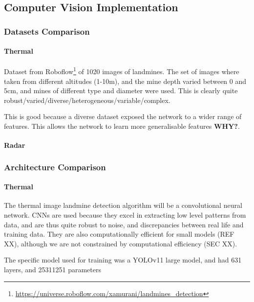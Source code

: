 \subsection{Computer Vision Implementation} \label{compvis_implementation}

\subsubsection{Datasets Comparison}

    \paragraph{Thermal}
    
        Dataset from Roboflow\footnote{\url{https://universe.roboflow.com/xamurani/landmines_detection}} of 1020 images of landmines. The set of images where taken from different altitudes (1-10m), and the mine depth varied between 0 and 5cm, and mines of different type and diameter were used. This is clearly quite robust/varied/diverse/heterogeneous/variable/complex.
        
        This is good because a diverse dataset exposed the network to a wider range of features. This allows the network to learn more generalisable features \textbf{WHY?}.
    
    \paragraph{Radar}

\subsubsection{Architecture Comparison}

    \paragraph{Thermal}
    
        The thermal image landmine detection algorithm will be a  convolutional neural network. CNNs are used because they excel in extracting low level patterns from data, and are thus quite robust to noise, and discrepancies between real life and training data. They are also computationally efficient for small models (REF XX), although we are not constrained by computational efficiency (SEC XX).
        
        The specific model used for training was a YOLOv11 large model, and had 631 layers, and  25311251 parameters
    
